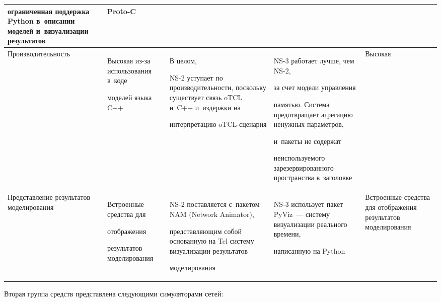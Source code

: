 \begin{table}[b]
\begin{center}
\begin{tabular}{|p{13.8mm}|p{17mm}|p{38mm}|p{39mm}|p{15mm}|}
ограниченная поддержка Python в~описании моделей и~визуализации результатов&Proto-C\\


\hline


Произ\-во\-ди\-тель\-ность&Высокая из-за использования в~коде\newline


моделей языка C++&В целом,


NS-2 уступает по производи\-тель\-ности, поскольку су\-ще\-ст\-вует связь oTCL и~C++ и~издержки на


интерпретацию oTCL-сце\-на\-рия&NS-3 работает лучше, чем NS-2,


за счет модели управ\-ле\-ния


па\-мятью. Сис\-те\-ма предотвращает агрегацию ненужных параметров,


и~пакеты не содержат


не\-ис\-поль\-зу\-емо\-го зарезервированного пространства в~заголовке&Высокая\\


\hline


Пред\-став\-ление результатов моделирования&Встро\-ен\-ные средства для


отоб\-ра\-же\-ния


результатов моделирования&NS-2 поставляется с~пакетом NAM (Network Animator),


представляющим собой основанную на Tcl систему визуализации результатов


моделирования&NS-3 использует пакет PyViz~--- систему визуализации реального времени,


написанную на Python&Встро\-ен\-ные средства для отоб\-ра\-же\-ния результатов моделирования\\


\hline


\end{tabular}


\end{center}


\end{table}








  Вторая группа средств представлена следующими симуляторами сетей:


